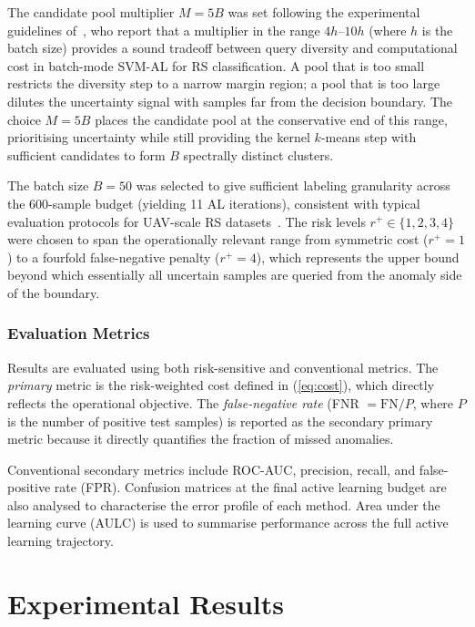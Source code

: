 \documentclass[lettersize,journal]{IEEEtran}
\begin{document}
The candidate pool multiplier $M = 5B$ was set following the experimental
guidelines of~\cite{demir2011batch}, who report that a multiplier in the
range $4h$--$10h$ (where $h$ is the batch size) provides a sound tradeoff
between query diversity and computational cost in batch-mode SVM-AL for RS
classification. A pool that is too small restricts the diversity step to a
narrow margin region; a pool that is too large dilutes the uncertainty signal
with samples far from the decision boundary. The choice $M = 5B$ places
the candidate pool at the conservative end of this range, prioritising
uncertainty while still providing the kernel $k$-means step with sufficient
candidates to form $B$ spectrally distinct clusters.

The batch size $B = 50$ was selected to give sufficient labeling
granularity across the 600-sample budget (yielding 11 AL iterations),
consistent with typical evaluation protocols for UAV-scale RS
datasets~\cite{tuia2011survey,demir2011batch}. The risk levels
$r^{+} \in \{1, 2, 3, 4\}$ were chosen to span the operationally
relevant range from symmetric cost ($r^{+}=1$) to a fourfold
false-negative penalty ($r^{+}=4$), which represents the upper bound
beyond which essentially all uncertain samples are queried from the
anomaly side of the boundary.

\subsubsection{Evaluation Metrics}

Results are evaluated using both risk-sensitive and conventional
metrics. The \textit{primary} metric is the risk-weighted cost defined
in (\ref{eq:cost}), which directly reflects the operational objective.
The \textit{false-negative rate} (FNR $= \mathrm{FN}/P$, where $P$ is
the number of positive test samples) is reported as the secondary
primary metric because it directly quantifies the fraction of missed
anomalies.

Conventional secondary metrics include ROC-AUC, precision, recall, and
false-positive rate (FPR). Confusion matrices at the final active
learning budget are also analysed to characterise the error profile of
each method. Area under the learning curve (AULC) is used to summarise
performance across the full active learning trajectory.

\section{Experimental Results}
\end{document}
